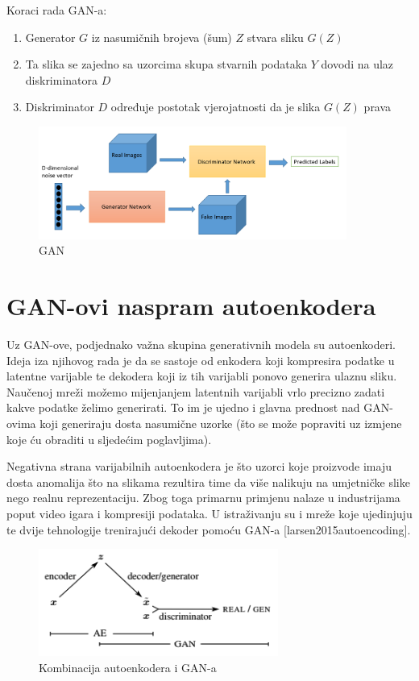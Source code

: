 \documentclass[lmodern, utf8, seminar]{fer}
\begin{document}
Koraci rada GAN-a:
\begin{enumerate} 
\item Generator $G$ iz nasumičnih brojeva (šum) $Z$ stvara sliku $G(Z)$
\item Ta slika se zajedno sa uzorcima skupa stvarnih podataka $Y$ dovodi na ulaz diskriminatora $D$
\item Diskriminator $D$ određuje postotak vjerojatnosti da je slika $G(Z)$ prava
\end{enumerate}

\begin{figure}[H]
    \centering
    \includegraphics[width=0.9\textwidth]{gan_schema}
    \caption{GAN \cite{goodfellow2016nips}}
    \label{fig:convolution}
\end{figure}

\newpage
\section{GAN-ovi naspram autoenkodera}
Uz GAN-ove, podjednako važna skupina generativnih modela su autoenkoderi. Ideja iza njihovog rada je da se sastoje od enkodera koji kompresira podatke u latentne varijable te dekodera koji iz tih varijabli ponovo generira ulaznu sliku. Naučenoj mreži možemo mijenjanjem latentnih varijabli vrlo precizno zadati kakve podatke želimo generirati. To im je ujedno i glavna prednost nad GAN-ovima koji generiraju dosta nasumične uzorke (što se može popraviti uz izmjene koje ću obraditi u sljedećim poglavljima).

Negativna strana varijabilnih autoenkodera je što uzorci koje proizvode imaju dosta anomalija što na slikama rezultira time da više nalikuju na umjetničke slike nego realnu reprezentaciju. Zbog toga primarnu primjenu nalaze u industrijama poput video igara i kompresiji podataka. U istraživanju su i mreže koje ujedinjuju te dvije tehnologije trenirajući dekoder pomoću GAN-a [larsen2015autoencoding].

\begin{figure}[H]
    \centering
    \includegraphics[width=0.7\textwidth]{vae-gan}
    \caption{Kombinacija autoenkodera i GAN-a}
    \label{fig:vae-gan}
\end{figure}
\end{document}
